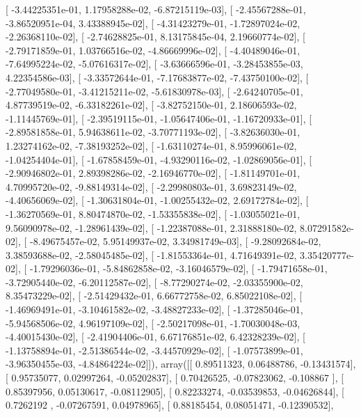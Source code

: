 \documentclass{article}
\begin{document}
       [ -3.44225351e-01,   1.17958288e-02,  -6.87215119e-03],
       [ -2.45567288e-01,  -3.86520951e-04,   3.43388945e-02],
       [ -4.31423279e-01,  -1.72897024e-02,  -2.26368110e-02],
       [ -2.74628825e-01,   8.13175845e-04,   2.19660774e-02],
       [ -2.79171859e-01,   1.03766516e-02,  -4.86669996e-02],
       [ -4.40489046e-01,  -7.64995224e-02,  -5.07616317e-02],
       [ -3.63666596e-01,  -3.28453855e-03,   4.22354586e-03],
       [ -3.33572644e-01,  -7.17683877e-02,  -7.43750100e-02],
       [ -2.77049580e-01,  -3.41215211e-02,  -5.61830978e-03],
       [ -2.64240705e-01,   4.87739519e-02,  -6.33182261e-02],
       [ -3.82752150e-01,   2.18606593e-02,  -1.11445769e-01],
       [ -2.39519115e-01,  -1.05647406e-01,  -1.16720933e-01],
       [ -2.89581858e-01,   5.94638611e-02,  -3.70771193e-02],
       [ -3.82636030e-01,   1.23274162e-02,  -7.38193252e-02],
       [ -1.63110274e-01,   8.95996061e-02,  -1.04254404e-01],
       [ -1.67858459e-01,  -4.93290116e-02,  -1.02869056e-01],
       [ -2.90946802e-01,   2.89398286e-02,  -2.16946770e-02],
       [ -1.81149701e-01,   4.70995720e-02,  -9.88149314e-02],
       [ -2.29980803e-01,   3.69823149e-02,  -4.40656069e-02],
       [ -1.30631804e-01,  -1.00255432e-02,   2.69172784e-02],
       [ -1.36270569e-01,   8.80474870e-02,  -1.53355838e-02],
       [ -1.03055021e-01,   9.56090978e-02,  -1.28961439e-02],
       [ -1.22387088e-01,   2.31888180e-02,   8.07291582e-02],
       [ -8.49675457e-02,   5.95149937e-02,   3.34981749e-03],
       [ -9.28092684e-02,   3.38593688e-02,  -2.58045485e-02],
       [ -1.81553364e-01,   4.71649391e-02,   3.35420777e-02],
       [ -1.79296036e-01,  -5.84862858e-02,  -3.16046579e-02],
       [ -1.79471658e-01,  -3.72905440e-02,  -6.20112587e-02],
       [ -8.77290274e-02,  -2.03355900e-02,   8.35473229e-02],
       [ -2.51429432e-01,   6.66772758e-02,   6.85022108e-02],
       [ -1.46969491e-01,  -3.10461582e-02,  -3.48827233e-02],
       [ -1.37285046e-01,  -5.94568506e-02,   4.96197109e-02],
       [ -2.50217098e-01,  -1.70030048e-03,  -4.40015430e-02],
       [ -2.41904406e-01,   6.67176851e-02,   6.42328239e-02],
       [ -1.13758894e-01,  -2.51386544e-02,  -3.44570929e-02],
       [ -1.07573899e-01,  -3.96350455e-03,  -4.84864224e-02]]), array([[ 0.89511323,  0.06488786, -0.13431574],
       [ 0.95735077,  0.02997264, -0.05202837],
       [ 0.70426525, -0.07823062, -0.108867  ],
       [ 0.85397956,  0.05130617, -0.08112905],
       [ 0.82233274, -0.03539853, -0.04626844],
       [ 0.7262192 , -0.07267591,  0.04978965],
       [ 0.88185454,  0.08051471, -0.12390532],
\end{document}
